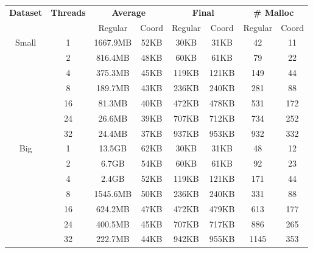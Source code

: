 \begin{tabular}{c | c || c c | c c | c c} \hline
	 \multirow{2}{*}{\textbf{Dataset}} & \multirow{2}{*}{\textbf{Threads}} & \multicolumn{2}{c|}{\textbf{Average}} & \multicolumn{2}{c|}{\textbf{Final}} & \multicolumn{2}{c}{\textbf{\# Malloc}}\\
	 & & Regular & Coord & Regular & Coord & Regular & Coord\\ \hline \hline
\multirow{7}{*}{Small}  & 1 &  1667.9MB & 52KB &  30KB & 31KB &  42 & 11\\
 & 2 &  816.4MB & 48KB &  60KB & 61KB &  79 & 22\\
 & 4 &  375.3MB & 45KB &  119KB & 121KB &  149 & 44\\
 & 8 &  189.7MB & 43KB &  236KB & 240KB &  281 & 88\\
 & 16 &  81.3MB & 40KB &  472KB & 478KB &  531 & 172\\
 & 24 &  26.6MB & 39KB &  707KB & 712KB &  734 & 252\\
 & 32 &  24.4MB & 37KB &  937KB & 953KB &  932 & 332\\
\hline
\multirow{7}{*}{Big}  & 1 &  13.5GB & 62KB &  30KB & 31KB &  48 & 12\\
 & 2 &  6.7GB & 54KB &  60KB & 61KB &  92 & 23\\
 & 4 &  2.4GB & 52KB &  119KB & 121KB &  171 & 44\\
 & 8 &  1545.6MB & 50KB &  236KB & 240KB &  331 & 88\\
 & 16 &  624.2MB & 47KB &  472KB & 479KB &  613 & 177\\
 & 24 &  400.5MB & 45KB &  707KB & 717KB &  886 & 265\\
 & 32 &  222.7MB & 44KB &  942KB & 955KB &  1145 & 353\\
\hline
\end{tabular}
